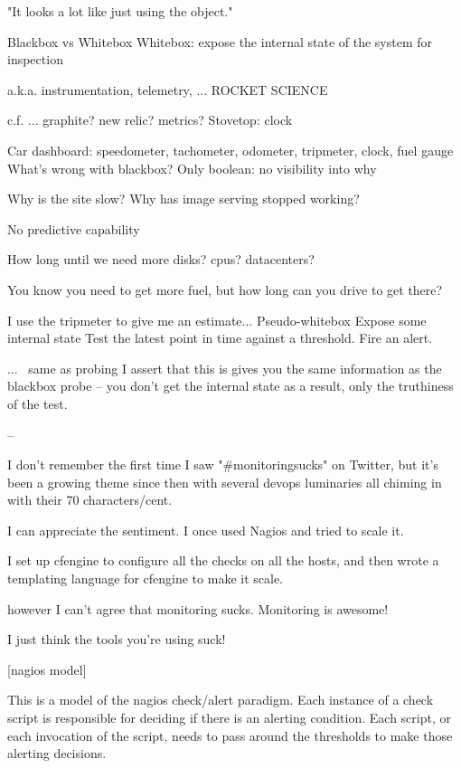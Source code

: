 \documentclass[online,12pt,helvetica]{chaksem}
\begin{document}
"It looks a lot like just using the object."   

Blackbox vs Whitebox
Whitebox: expose the internal state of the system for inspection

a.k.a. instrumentation, telemetry,
... ROCKET SCIENCE

c.f. ... graphite? new relic? metrics?
Stovetop: clock                                                                                                                             
                                                                                                                                                               
Car dashboard: speedometer, tachometer, odometer, tripmeter, clock, fuel gauge
What's wrong with blackbox?
Only boolean: no visibility into why

Why is the site slow?
Why has image serving stopped working?

No predictive capability

How long until we need more disks? cpus? datacenters?

You know you need to get more fuel, but how long can you drive to get there?

I use the tripmeter to give me an estimate...
Pseudo-whitebox
Expose some internal state
Test the latest point in time against a threshold.
Fire an alert.



... ~same as probing
I assert that this is gives you the same information as the blackbox probe -- you don't get the internal state as a result, only the truthiness of the test.

--

I don't remember the first time I saw "{\#}monitoringsucks" on Twitter, but it's
been a growing theme since then with several devops luminaries all chiming in
with their 70 characters/cent.

I can appreciate the sentiment.  I once used Nagios and tried to scale it.

I set up cfengine to configure all the checks on all the hosts, and then wrote
a templating language for cfengine to make it scale.

however I can't agree that monitoring sucks.   Monitoring is awesome!

I just think the tools you're using suck!


[nagios model]

This is a model of the nagios check/alert paradigm.  Each instance of a check
script is responsible for deciding if there is an alerting condition.  Each
script, or each invocation of the script, needs to pass around the thresholds
to make those alerting decisions.
\end{document}
